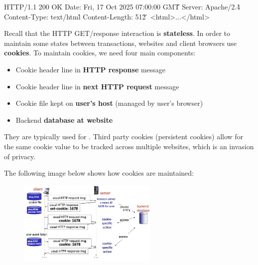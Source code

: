 \documentclass[12pt,a4paper]{article}
\begin{document}
\begin{shuncmd}
  HTTP/1.1 200 OK\r\n
  Date: Fri, 17 Oct 2025 07:00:00 GMT\r\n
  Server: Apache/2.4\r\n
  Content-Type: text/html\r\n
  Content-Length: 512\r\n
  \r\n
  <html>...</html>
\end{shuncmd}  

\vspace{1.0em}

\noindent Recall that the HTTP GET/response interaction is \textbf{stateless}. In order to maintain some states between transactions, websites and client browsers use \textbf{cookies}. To maintain cookies, we need four main components: \\

\begin{itemize}
  \item Cookie header line in \textbf{HTTP response} message
  \item Cookie header line in \textbf{next HTTP request} message
  \item Cookie file kept on \textbf{user's host} (managed by user's browser)
  \item Backend \textbf{database at website}
\end{itemize}

\noindent They are typically used for . Third party cookies (persistent cookies) allow for the same cookie value to be tracked across multiple websites, which is an invasion of privacy.

\noindent The following image below shows how cookies are maintained:
\begin{figure}[h]
  \centering
  \includegraphics[width=0.6\textwidth]{ch2_img/cookies.jpg}
\end{figure}


\end{document}
